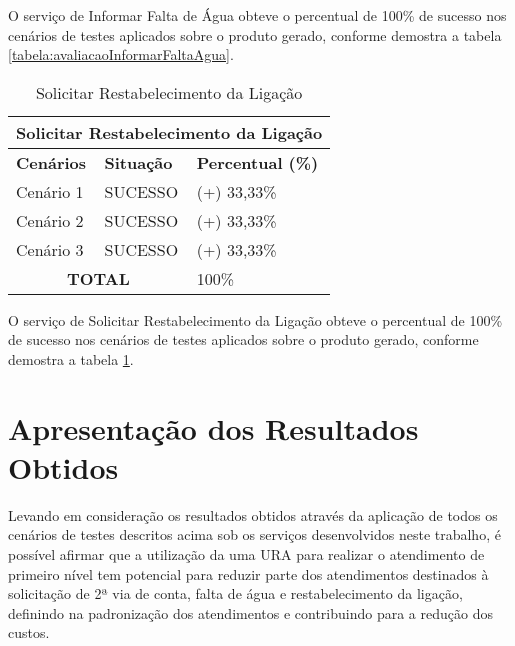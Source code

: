O serviço de Informar Falta de Água obteve o percentual de 100\% de sucesso nos cenários de testes aplicados sobre o produto gerado, conforme demostra a tabela \ref{tabela:avaliacaoInformarFaltaAgua}.


\begin{table}[H]
	\center
	\footnotesize
	\caption{Solicitar Restabelecimento da Ligação}
	\label{tabela:avaliacaoRestabelerLigacaoAgua}
	\begin{tabular}{|p{3cm}|p{3cm}|p{3cm}|}
		\hline
		\multicolumn{3}{|c|}{\textbf{Solicitar Restabelecimento da Ligação}} \\
		\hline
		\textbf{Cenários}  	& \textbf{Situação} & \textbf{Percentual (\%)}  \\
		\hline		
		Cenário 1			& SUCESSO 		& (+) 33,33\% 	\\
		\hline
		Cenário 2 			& SUCESSO		& (+) 33,33\% 	\\
		\hline
		Cenário 3 			& SUCESSO 		& (+) 33,33\%	\\
		\hline		
		\multicolumn{2}{|c|}{\textbf{TOTAL}}	& 100\% 	\\
		\hline				
	\end{tabular}
\end{table}

O serviço de Solicitar Restabelecimento da Ligação obteve o percentual de 100\% de sucesso nos cenários de testes aplicados sobre o produto gerado, conforme demostra a tabela \ref{tabela:avaliacaoRestabelerLigacaoAgua}.



\section{Apresentação dos Resultados Obtidos}

Levando em consideração os resultados obtidos através da aplicação de todos os cenários de testes descritos acima sob os serviços desenvolvidos neste trabalho,
é possível afirmar que a utilização da uma URA para realizar o atendimento de primeiro nível tem potencial para reduzir parte dos atendimentos destinados à solicitação de 2ª via de conta, falta de água e restabelecimento da ligação, definindo na padronização dos atendimentos e contribuindo para a redução dos custos.
 


